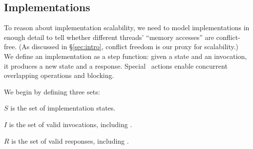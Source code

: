 %

\begin{comment}
  Finally, \SRI\ commutativity is region-oriented. In contrast with
  typical definitions of commutativity, which consider pairs of
  operations, \SRI\ commutativity applies to any number of threads with
  arbitrary sequences of potentially concurrent operations. This is not
  strictly required by the commutativity rule, but it is a natural
  generalization and it is often convenient to consider likely sequences
  of concurrent operations.
\end{comment}



\subsection{Implementations}

To reason about implementation scalability, we need to model
implementations in enough detail to tell
whether different threads' ``memory accesses'' are conflict-free. (As 
discussed in \S\ref{sec:intro}, conflict freedom is our proxy for
scalability.) We define an implementation as a step
function: given a state and an invocation, it produces a new state and a
response. Special \POLL\ actions enable
concurrent overlapping operations and blocking.

We begin by defining three sets:

\begin{CompactItemize}
\item $S$ is the set of implementation states.
\item $I$ is the set of valid invocations, including \POLL.
\item $R$ is the set of valid responses, including \POLL.
\end{CompactItemize}

